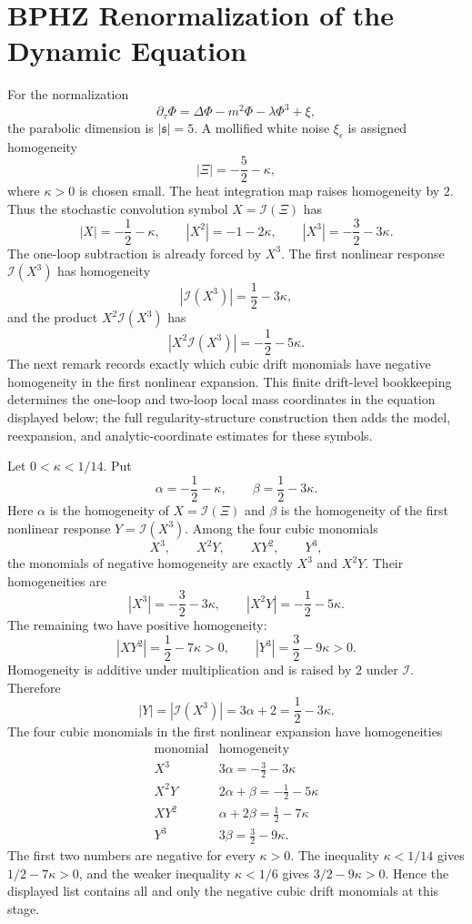 \section{BPHZ Renormalization of the Dynamic Equation}

For the normalization
\[
  \partial_\tau\Phi
  =
  \Delta\Phi-m^2\Phi-\lambda\Phi^3+\xi ,
\]
the parabolic dimension is \(|\mathfrak s|=5\).  A mollified white noise
\(\xi_\epsilon\) is assigned homogeneity
\[
  |\Xi|=-\frac52-\kappa ,
\]
where \(\kappa>0\) is chosen small.  The heat integration map raises
homogeneity by \(2\).  Thus the stochastic convolution symbol
\(X=\mathcal I(\Xi)\) has
\[
  |X|=-\frac12-\kappa ,
  \qquad
  |X^2|=-1-2\kappa ,
  \qquad
  |X^3|=-\frac32-3\kappa .
\]
The one-loop subtraction is already forced by \(X^3\).  The first nonlinear
response \(\mathcal I(X^3)\) has homogeneity
\[
  |\mathcal I(X^3)|=\frac12-3\kappa ,
\]
and the product \(X^2\mathcal I(X^3)\) has
\[
  |X^2\mathcal I(X^3)|=-\frac12-5\kappa .
\]
The next remark records exactly which cubic drift monomials have
negative homogeneity in the first nonlinear expansion.  This finite
drift-level bookkeeping determines the one-loop and two-loop local mass
coordinates in the equation displayed below; the full
regularity-structure construction then adds the model, reexpansion, and
analytic-coordinate estimates for these symbols.

\begin{remark}
\label{rem:spde-phi-four-three-negative-drift-bookkeeping}
Let \(0<\kappa<1/14\).  Put
\[
  \alpha=-\frac12-\kappa,\qquad
  \beta=\frac12-3\kappa .
\]
Here \(\alpha\) is the homogeneity of \(X=\mathcal I(\Xi)\) and \(\beta\) is
the homogeneity of the first nonlinear response
\(Y=\mathcal I(X^3)\).  Among the four cubic monomials
\[
  X^3,\qquad X^2Y,\qquad XY^2,\qquad Y^3 ,
\]
the monomials of negative homogeneity are exactly \(X^3\) and \(X^2Y\).
Their homogeneities are
\[
  |X^3|=-\frac32-3\kappa,\qquad
  |X^2Y|=-\frac12-5\kappa .
\]
The remaining two have positive homogeneity:
\[
  |XY^2|=\frac12-7\kappa>0,\qquad
  |Y^3|=\frac32-9\kappa>0 .
\]
Homogeneity is additive under multiplication and is raised by \(2\) under
\(\mathcal I\).  Therefore
\[
  |Y|=|\mathcal I(X^3)|=3\alpha+2=\frac12-3\kappa .
\]
The four cubic monomials in the first nonlinear expansion have homogeneities
\[
\begin{array}{c|c}
  \text{monomial} & \text{homogeneity} \\
  \hline
  X^3 & 3\alpha=-\frac32-3\kappa \\
  X^2Y & 2\alpha+\beta=-\frac12-5\kappa \\
  XY^2 & \alpha+2\beta=\frac12-7\kappa \\
  Y^3 & 3\beta=\frac32-9\kappa .
\end{array}
\]
The first two numbers are negative for every \(\kappa>0\).  The inequality
\(\kappa<1/14\) gives \(1/2-7\kappa>0\), and the weaker inequality
\(\kappa<1/6\) gives \(3/2-9\kappa>0\).  Hence the displayed list contains
all and only the negative cubic drift monomials at this stage.
\end{remark}

